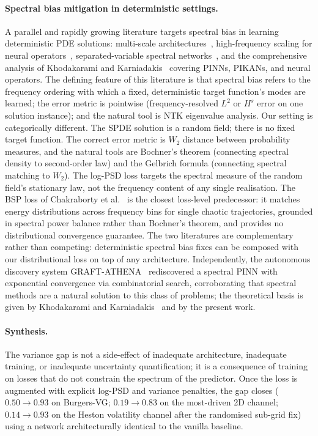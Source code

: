 \documentclass[review,12pt]{elsarticle}
\begin{document}
\paragraph{Spectral bias mitigation in deterministic settings.}
A parallel and rapidly growing literature targets spectral bias in
learning deterministic PDE solutions: multi-scale
architectures~\cite{WangMscaleDNN2023,WangMscaleDeepONet2025},
high-frequency scaling for neural
operators~\cite{KhodakaramiHFS2025}, separated-variable spectral
networks~\cite{XiongSVSNN2025}, and the comprehensive analysis of
Khodakarami and Karniadakis~\cite{KhodakaramiKarniadakis2026}
covering PINNs, PIKANs, and neural operators.
The defining feature of this literature is that spectral bias refers
to the frequency ordering with which a fixed, deterministic target
function's modes are learned; the error metric is pointwise
(frequency-resolved \(L^2\) or \(H^s\) error on one solution
instance); and the natural tool is NTK eigenvalue analysis.
Our setting is categorically different.
The SPDE solution is a random field; there is no fixed target
function.
The correct error metric is \(W_2\) distance between probability
measures, and the natural tools are Bochner's theorem (connecting
spectral density to second-order law) and the Gelbrich formula
(connecting spectral matching to \(W_2\)).
The log-PSD loss targets the spectral measure of the random field's
stationary law, not the frequency content of any single realisation.
The BSP loss of Chakraborty et al.~\cite{Chakraborty2025BSP} is the
closest loss-level predecessor: it matches energy distributions across
frequency bins for single chaotic trajectories, grounded in spectral
power balance rather than Bochner's theorem, and provides no
distributional convergence guarantee.
The two literatures are complementary rather than competing:
deterministic spectral bias fixes can be composed with our
distributional loss on top of any architecture.
Independently, the autonomous discovery system
GRAFT-ATHENA~\citep{ToscanoEtAl2026GRAFTATHENA} rediscovered a
spectral PINN with exponential convergence via combinatorial search,
corroborating that spectral methods are a natural solution to this
class of problems; the theoretical basis is given by Khodakarami and
Karniadakis~\citep{KhodakaramiKarniadakis2026} and by the present
work.

\paragraph{Synthesis.}
The variance gap is not a side-effect of inadequate architecture,
inadequate training, or inadequate uncertainty quantification;
it is a consequence of training on losses that do not constrain
the spectrum of the predictor. Once the loss is augmented with
explicit log-PSD and variance penalties, the gap closes
(\(0.50\to 0.93\) on Burgers-VG; \(0.19 \to 0.83\) on the
most-driven 2D channel; \(0.14 \to 0.93\) on the Heston volatility
channel after the randomised sub-grid fix) using a network
architecturally identical to the vanilla baseline.
\end{document}
